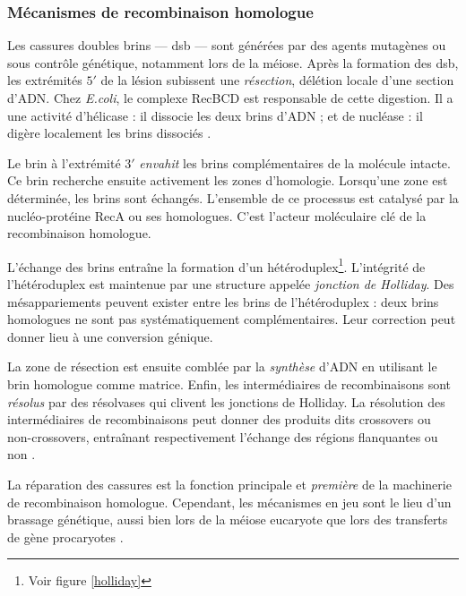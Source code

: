 \documentclass[11pt, oneside]{scrartcl}
\begin{document}
\subsubsection{Mécanismes de recombinaison homologue}
\label{sec:orgheadline2}

Les cassures doubles brins --- \ac{dsb} --- sont générées par des agents
mutagènes ou sous contrôle génétique, notamment lors de la méiose. Après la
formation des \ac{dsb}, les extrémités \(5'\) de la lésion subissent une
\emph{résection}, délétion locale d'une section d'ADN. Chez \emph{E.coli}, le complexe
RecBCD est responsable de cette digestion. Il a une activité d'hélicase : il
dissocie les deux brins d'ADN ; et de nucléase : il digère localement les brins
dissociés \cite{dillingham_recbcd_2008}.

Le brin à l'extrémité \(3'\) \emph{envahit} les brins complémentaires de la molécule
intacte. Ce brin recherche ensuite activement les zones d'homologie. Lorsqu'une
zone est déterminée, les brins sont échangés. L'ensemble de ce processus est
catalysé par la nucléo-protéine RecA \cite{chen_mechanism_2008} ou ses
homologues. C'est l'acteur moléculaire clé de la recombinaison homologue.

L'échange des brins entraîne la formation d'un hétéroduplex\footnote{Voir figure
\ref{holliday}}. L'intégrité de l'hétéroduplex est maintenue par une structure
appelée \emph{jonction de Holliday}. Des mésappariements peuvent exister entre les
brins de l'hétéroduplex : deux brins homologues ne sont pas systématiquement
complémentaires. Leur correction peut donner lieu à une conversion génique.

La zone de résection est ensuite comblée par la \emph{synthèse} d'ADN en utilisant le
brin homologue comme matrice. Enfin, les intermédiaires de recombinaisons sont
\emph{résolus} par des résolvases qui clivent les jonctions de Holliday. La résolution
des intermédiaires de recombinaisons peut donner des produits dits crossovers ou
non-crossovers, entraînant respectivement l'échange des régions flanquantes ou
non \cite{mancera_high-resolution_2008}.

\begin{transition}
La réparation des cassures est la fonction principale et \emph{première} de la
machinerie de recombinaison homologue. Cependant, les mécanismes en jeu sont le
lieu d'un brassage génétique, aussi bien lors de la méiose eucaryote que lors
des transferts de gène procaryotes \cite{redfield_bacteria_2001}.
\end{transition}
\end{document}
